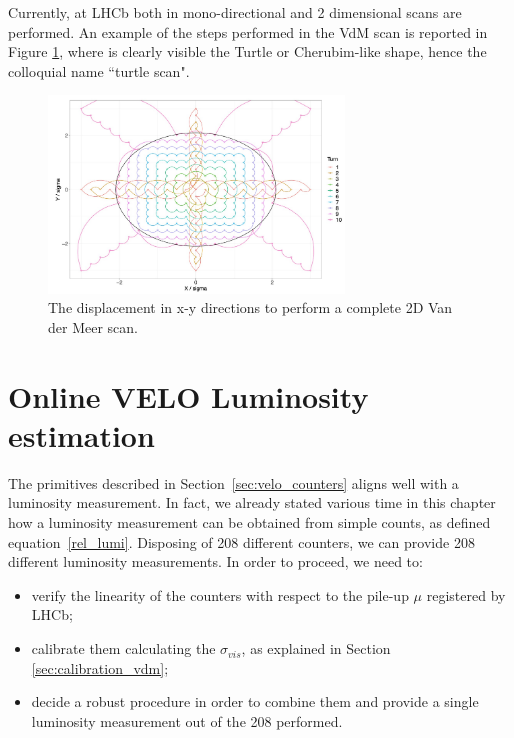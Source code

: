 Currently, at LHCb both in mono-directional and 2 dimensional scans are performed. An example of the steps performed in the VdM scan is reported in Figure \ref{fig:vdm_steps_xy}, where is clearly visible the Turtle or Cherubim-like shape, hence the colloquial name ``turtle scan".

\begin{figure}
    \centering
    \includegraphics[width=0.7\textwidth]{figures/vdm_steps_xy.png}
    \caption{The displacement in x-y directions to perform a complete 2D Van der Meer scan.}
    \label{fig:vdm_steps_xy}
\end{figure}





\section{Online VELO Luminosity estimation}
The primitives described in Section~\ref{sec:velo_counters} aligns well with a luminosity measurement. In fact, we already stated various time in this chapter how a luminosity measurement can be obtained from simple counts, as defined equation~\eqref{rel_lumi}. Disposing of 208 different counters, we can provide 208 different luminosity measurements. 
In order to proceed, we need to:
\begin{itemize}
    \item verify the linearity of the counters with respect to the pile-up $\mu$ registered by LHCb;
    \item calibrate them calculating the $\sigma_{vis}$, as explained in Section \ref{sec:calibration_vdm};
    \item decide a robust procedure in order to combine them and provide a single luminosity measurement out of the 208 performed.
\end{itemize}


